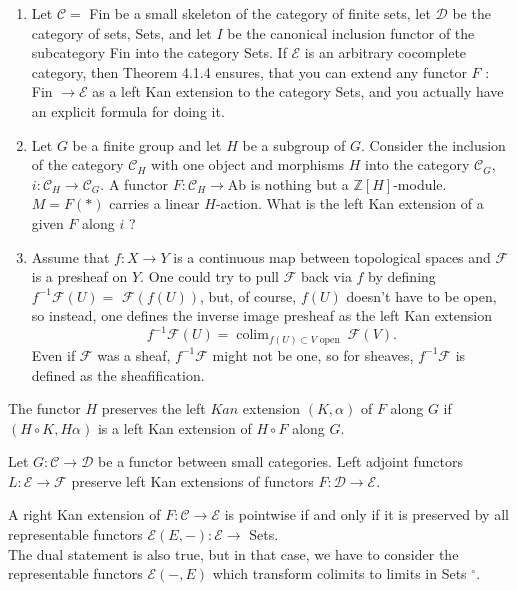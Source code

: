 \begin{example}
    \begin{enumerate}
        \item Let $\mathcal{C}=$ Fin be a small skeleton of the category of finite sets, let $\mathcal{D}$ be the category of sets, Sets, and let $I$ be the canonical inclusion functor of the subcategory Fin into the category Sets. If $\mathcal{E}$ is an arbitrary cocomplete category, then Theorem 4.1.4 ensures, that you can extend any functor $F$ : Fin $\rightarrow \mathcal{E}$ as a left Kan extension to the category Sets, and you actually have an explicit formula for doing it.
        \item Let $G$ be a finite group and let $H$ be a subgroup of $G$. Consider the inclusion of the category $\mathcal{C}_H$ with one object and morphisms $H$ into the category $\mathcal{C}_G$, $i: \mathcal{C}_H \rightarrow \mathcal{C}_G$. A functor $F: \mathcal{C}_H \rightarrow \mathrm{Ab}$ is nothing but a $\mathbb{Z}[H]$-module. $M=F(*)$ carries a linear $H$-action. What is the left Kan extension of a given $F$ along $i$ ?
        \item Assume that $f: X \rightarrow Y$ is a continuous map between topological spaces and $\mathcal{F}$ is a presheaf on $Y$. One could try to pull $\mathcal{F}$ back via $f$ by defining $f^{-1} \mathcal{F}(U)=$ $\mathcal{F}(f(U))$, but, of course, $f(U)$ doesn't have to be open, so instead, one defines the inverse image presheaf as the left Kan extension
        $$
        f^{-1} \mathcal{F}(U)=\operatorname{colim}_{f(U) \subset V \text { open }} \mathcal{F}(V) .
        $$
        Even if $\mathcal{F}$ was a sheaf, $f^{-1} \mathcal{F}$ might not be one, so for sheaves, $f^{-1} \mathcal{F}$ is defined as the sheafification.
    \end{enumerate}
\end{example}


The functor $H$ preserves the left $K a n$ extension $(K, \alpha)$ of $F$ along $G$ if $(H \circ K, H \alpha)$ is a left Kan extension of $H \circ F$ along $G$.

\begin{theo}
Let $G: \mathcal{C} \rightarrow \mathcal{D}$ be a functor between small categories. Left adjoint functors $L: \mathcal{E} \rightarrow \mathcal{F}$ preserve left Kan extensions of functors $F: \mathcal{D} \rightarrow \mathcal{E}$.
\end{theo}

A right Kan extension of $F: \mathcal{C} \rightarrow \mathcal{E}$ is pointwise if and only if it is preserved by all representable functors $\mathcal{E}(E,-): \mathcal{E} \rightarrow$ Sets.\\
The dual statement is also true, but in that case, we have to consider the representable functors $\mathcal{E}(-, E)$ which transform colimits to limits in Sets ${ }^{\circ}$.

